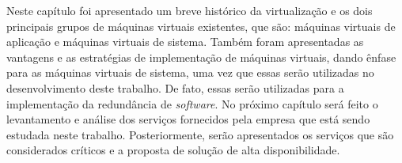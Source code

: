 Neste capítulo foi apresentado um breve histórico da virtualização e os dois principais grupos de máquinas virtuais existentes, que são: máquinas 
virtuais de aplicação e máquinas virtuais de sistema. Também foram apresentadas as vantagens e as estratégias de implementação de máquinas virtuais, 
dando ênfase para as máquinas virtuais de sistema, uma vez que essas serão utilizadas no desenvolvimento deste trabalho. De fato, essas serão 
utilizadas para a implementação da redundância de \textit{software}. No próximo capítulo será feito o levantamento e análise dos serviços 
fornecidos pela empresa que está sendo estudada neste trabalho. Posteriormente, serão apresentados os serviços que são considerados críticos 
e a proposta de solução de alta disponibilidade.
